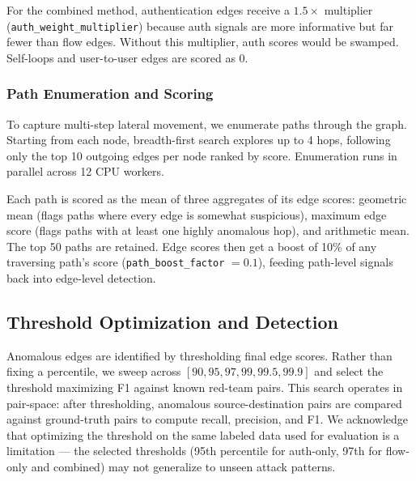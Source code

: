 For the combined method, authentication edges receive a $1.5\times$ multiplier (\texttt{auth\_weight\_multiplier}) because auth signals are more informative but far fewer than flow edges. Without this multiplier, auth scores would be swamped. Self-loops and user-to-user edges are scored as 0.

\subsubsection{Path Enumeration and Scoring}
To capture multi-step lateral movement, we enumerate paths through the graph. Starting from each node, breadth-first search explores up to 4 hops, following only the top 10 outgoing edges per node ranked by score. Enumeration runs in parallel across 12 CPU workers.

Each path is scored as the mean of three aggregates of its edge scores: geometric mean (flags paths where every edge is somewhat suspicious), maximum edge score (flags paths with at least one highly anomalous hop), and arithmetic mean. The top 50 paths are retained. Edge scores then get a boost of 10\% of any traversing path's score (\texttt{path\_boost\_factor} $= 0.1$), feeding path-level signals back into edge-level detection.

\subsection{Threshold Optimization and Detection}

Anomalous edges are identified by thresholding final edge scores. Rather than fixing a percentile, we sweep across $[90, 95, 97, 99, 99.5, 99.9]$ and select the threshold maximizing F1 against known red-team pairs. This search operates in pair-space: after thresholding, anomalous source-destination pairs are compared against ground-truth pairs to compute recall, precision, and F1. We acknowledge that optimizing the threshold on the same labeled data used for evaluation is a limitation --- the selected thresholds (95th percentile for auth-only, 97th for flow-only and combined) may not generalize to unseen attack patterns.
